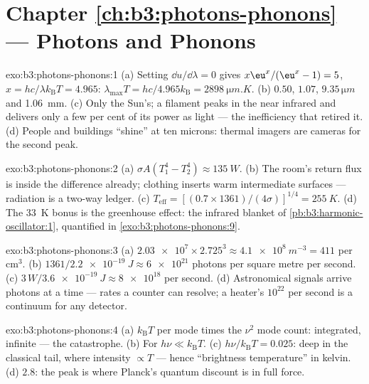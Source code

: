 \section*{Chapter \ref{ch:b3:photons-phonons} --- Photons and Phonons}

\begin{solution}{exo:b3:photons-phonons:1}
(a) Setting $\dd u/\dd\lambda = 0$ gives $x\eu^x/(\eu^x - 1) = 5$,
$x = hc/\lambda k_{\text{B}}T = 4.965$: $\lambda_{\max}T =
hc/4.965k_{\text{B}} = \qty{2898}{\micro m.K}$. (b) $0.50$,
$1.07$, $9.35\,\unit{\micro m}$ and \qty{1.06}{mm}. (c) Only the
Sun's; a filament peaks in the near infrared and delivers only a
few per cent of its power as light --- the inefficiency that
retired it. (d) People and buildings ``shine'' at ten microns:
thermal imagers are cameras for the second peak.
\end{solution}

\begin{solution}{exo:b3:photons-phonons:2}
(a) $\sigma A(T_1^4 - T_2^4) \approx \qty{135}{W}$. (b) The room's
return flux is inside the difference already; clothing inserts
warm intermediate surfaces --- radiation is a two-way ledger. (c)
$T_{\text{eff}} = [(0.7 \times 1361)/(4\sigma)]^{1/4} =
\qty{255}{K}$. (d) The \qty{33}{K} bonus is the greenhouse effect:
the infrared blanket of
\cref{pb:b3:harmonic-oscillator:1}, quantified in
\cref{exo:b3:photons-phonons:9}.
\end{solution}

\begin{solution}{exo:b3:photons-phonons:3}
(a) $\num{2.03e7} \times 2.725^3 \approx \qty{4.1e8}{m^{-3}} =
411$ per cm$^3$. (b) $1361/\qty{2.2e-19}{J} \approx
\num{6e21}$ photons per square metre per second. (c) $3\,\unit{W}/
\qty{3.6e-19}{J} \approx \num{8e18}$ per second. (d) Astronomical
signals arrive photons at a time --- rates a counter can resolve;
a heater's $10^{22}$ per second is a continuum for any detector.
\end{solution}

\begin{solution}{exo:b3:photons-phonons:4}
(a) $k_{\text{B}}T$ per mode times the $\nu^2$ mode count:
integrated, infinite --- the catastrophe. (b) For $h\nu \ll
k_{\text{B}}T$. (c) $h\nu/k_{\text{B}}T = 0.025$: deep in the
classical tail, where intensity $\propto T$ --- hence
``brightness temperature'' in kelvin. (d) $2.8$: the peak is
where Planck's quantum discount is in full force.
\end{solution}

